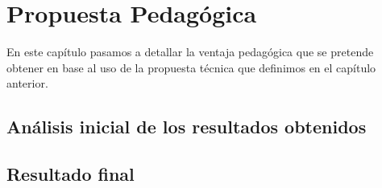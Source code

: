 \chapter{Propuesta Pedagógica}

En este capítulo pasamos a detallar la ventaja pedagógica que se pretende obtener en base al uso de la propuesta técnica que definimos en el capítulo anterior.

\section{Análisis inicial de los resultados obtenidos}


\section{Resultado final}




